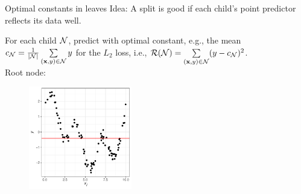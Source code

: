 \documentclass[11pt,compress,t,notes=noshow, xcolor=table]{beamer}
\begin{document}
\begin{vbframe}{Optimal constants in leaves}
Idea: A split is good if each child's point predictor reflects its data well. %
\vspace{0.2cm}

For each child $\mathcal{N}$, predict with optimal constant, e.g., the mean $c_{\mathcal{N}} = \frac{1}{|\mathcal{N}|}\sum\limits_{(\mathbf{x}, y) \in \mathcal{N}} y$ for the $L_2$ loss, i.e., $\mathcal{R}(\mathcal{N}) = \sum\limits_{(\mathbf{x}, y) \in \mathcal{N}} (y - c_{\mathcal{N}})^2$.\\

Root node:

\begin{figure}
\includegraphics[width=0.4\textwidth]{figure/splitcrit_optimal-constant.pdf} 
\end{figure}



\end{vbframe}
\end{document}
